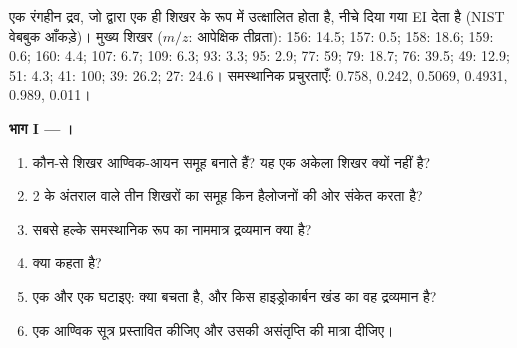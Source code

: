 \begin{problem}
\label{pb:b2:mass-spec-atomic:1}
एक रंगहीन द्रव, जो  द्वारा एक ही शिखर के रूप में उत्क्षालित होता है, नीचे दिया गया EI  देता है (NIST
वेबबुक आँकड़े)। मुख्य शिखर ($m/z$: आपेक्षिक तीव्रता): 156: 14.5; 157: 0.5; 158: 18.6; 159: 0.6; 160:
4.4; 107: 6.7; 109: 6.3; 93: 3.3; 95: 2.9; 77: 59; 79: 18.7; 76: 39.5; 49: 12.9; 51: 4.3; 41: 100; 39:
26.2; 27: 24.6। समस्थानिक प्रचुरताएँ:  0.758,  0.242,  0.5069,
 0.4931,  0.989,  0.011।

\begin{center}
\end{center}

\medskip
\noindent\textbf{भाग I --- ।}
\begin{enumerate}
  \item कौन-से शिखर आण्विक-आयन समूह बनाते हैं? यह एक अकेला शिखर क्यों नहीं है?
  \item 2 के अंतराल वाले तीन शिखरों का समूह किन हैलोजनों की ओर संकेत करता है?
  \item सबसे हल्के समस्थानिक रूप का नाममात्र द्रव्यमान क्या है?
  \item {} क्या कहता है?
  \item एक  और एक  घटाइए: क्या बचता है, और किस हाइड्रोकार्बन खंड का
        वह द्रव्यमान है?
  \item एक आण्विक सूत्र प्रस्तावित कीजिए और उसकी असंतृप्ति की मात्रा दीजिए।
\end{enumerate}


\end{problem}
